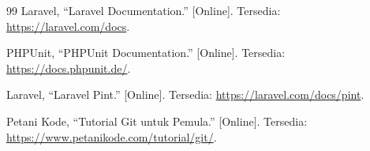 \documentclass[a4paper,oneside,12pt]{report}
\begin{document}
\begin{thebibliography}{99}
     Laravel, ``Laravel Documentation.'' [Online]. Tersedia: \url{https://laravel.com/docs}.

     PHPUnit, ``PHPUnit Documentation.'' [Online]. Tersedia: \url{https://docs.phpunit.de/}.

     Laravel, ``Laravel Pint.'' [Online]. Tersedia: \url{https://laravel.com/docs/pint}.

     Petani Kode, ``Tutorial Git untuk Pemula.'' [Online]. Tersedia: \url{https://www.petanikode.com/tutorial/git/}.

\end{thebibliography}
\end{document}
